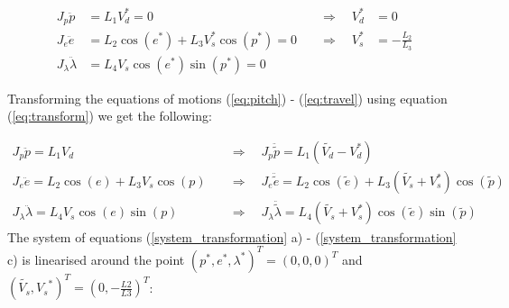 
\begin{align}
    J_p \ddot{p} &= L_1 V_d^* = 0 \quad &\Rightarrow \quad V_d^* &= 0  \\
    J_e \ddot{e} &= L_2 \cos(e^*) + L_3V_s^* \cos(p^*) = 0 \quad &\Rightarrow \quad V_s^* &= -\frac{L_2}{L_3} \label{eq:vs_eq} \\
   J_\lambda \ddot{\lambda}&=L_4V_s\cos({e}^*)\sin({p}^*)=0
   \end{align}


Transforming the equations of motions (\ref{eq:pitch}) - (\ref{eq:travel}) using equation (\ref{eq:transform}) we get the following:

\begin{subequations} \label{system_transformation}
\begin{align}
    J_p \ddot{p} = L_1 V_d \quad &\Rightarrow 
    \quad J_p \ddot{\tilde{p}}
    = L_1 \left( \tilde{V_d} - V_d^* \right)
    \\
    J_e \ddot{e} = L_2 \cos(e) + L_3 V_s \cos(p) \quad &\Rightarrow \quad J_e \ddot{\tilde{e}} = L_2 \cos(\tilde{e}) + L_3 \left( \tilde{V_s} + V_s^* \right) \cos(\tilde{p})
    \\
    J_\lambda \ddot{\lambda} = L_4 V_s \cos(e) \sin(p) \quad &\Rightarrow \quad J_\lambda \ddot{\tilde{\lambda}} = L_4 \left( \tilde{V_s} + V_s^* \right) \cos(\tilde{e}) \sin(\tilde{p})
\end{align}
\end{subequations}
The system of equations (\ref{system_transformation} a) - (\ref{system_transformation} c) is linearised around the point $({p}^*, {e}^*, \lambda^*)^T = (0, 0, 0)^T$ and 
$(\tilde{V_s},{V_s}^*)^T = (0, -\frac{L2}{L3})^T$:



